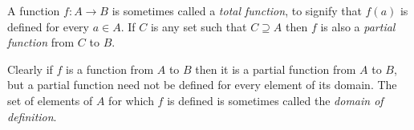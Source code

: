 \documentclass[12pt]{article}
\begin{document}
A function $f:A\rightarrow B$ is sometimes called a \emph{total function}, to signify that $f(a)$ is defined for every $a\in A$.  If $C$ is any set such that $C\supseteq A$ then $f$ is also a \emph{partial function} from $C$ to $B$.

Clearly if $f$ is a function from $A$ to $B$ then it is a partial function from $A$ to $B$, but a partial function need not be defined for every element of its domain.  The set of elements of $A$ for which $f$ is defined is sometimes called the \emph{domain of definition}.
\end{document}
